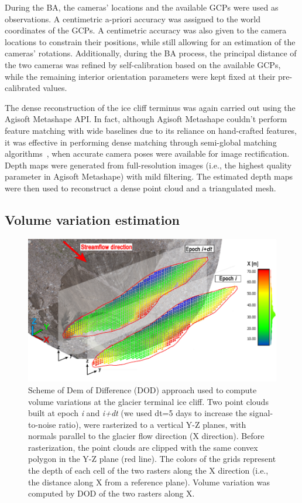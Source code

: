 During the BA, the cameras' locations and the available GCPs were used as observations.
A centimetric a-priori accuracy was assigned to the world coordinates of the GCPs.
A centimetric accuracy was also given to the camera locations to constrain their
positions, while still allowing for an estimation of the cameras' rotations.
Additionally, during the BA process, the principal distance of the
two cameras was refined by self-calibration based on the available GCPs, while the
remaining interior orientation parameters were kept fixed at their pre-calibrated values.

The dense reconstruction of the ice cliff terminus was again carried out using the
Agisoft Metashape API.
In fact, although Agisoft Metashape couldn't perform feature matching with wide baselines
due to its reliance on hand-crafted features, it was effective in performing dense
matching through semi-global matching
algorithms~\citep{Hirschmuller2012}, when accurate camera poses were available for image
rectification.
Depth maps were generated from full-resolution images (i.e., the highest
quality parameter in Agisoft Metashape) with mild filtering.
The estimated depth maps were then used to reconstruct a dense point cloud and a
triangulated mesh.


\subsection{Volume variation estimation}\label{sec:4:volumevariation}

\begin{figure}[ht]
\centering
  \includegraphics[width=1.0\linewidth]{3_dod_scheme.png}
  \caption{Scheme of Dem of Difference (DOD) approach used to compute volume variations
    at the glacier terminal ice cliff.
    Two point clouds built at epoch \textit{i} and \textit{i+dt} (we used dt=5 days to increase the signal-to-noise ratio), were rasterized to a vertical Y-Z planes, with normals parallel to the glacier flow direction (X direction).
    Before rasterization, the point clouds are clipped with the same convex polygon in
    the Y-Z plane (red line).
    The colors of the grids represent the depth of each cell of the two rasters along the X direction (i.e., the distance along X from a reference plane).
    Volume variation was computed by DOD of the two rasters along X.}
  \label{fig:4:dod_scheme}
\end{figure}

